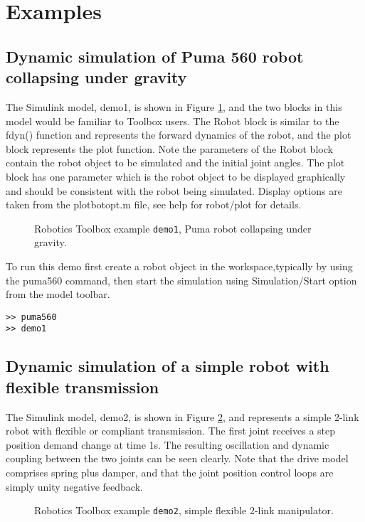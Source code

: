 \documentclass{article}
\newcommand{\var}[1]{{\vtt #1}}
\begin{document}
\section{Examples}
\subsection{Dynamic simulation of Puma 560 robot collapsing under gravity}
The Simulink model, \var{demo1}, is shown in Figure \ref{fig:demo1}, and 
the two blocks in this model would be
familiar to Toolbox users.
The \var{Robot} block is similar to the \var{fdyn()}
function and represents the forward dynamics of the robot, and the \var{plot}
block represents the \var{plot} function.
Note the parameters of the \var{Robot} block contain the robot object 
to be simulated and the initial joint angles.  
The \var{plot} block has one parameter which is the robot object to be 
displayed graphically and should be consistent with the robot being simulated.
Display options are taken from the \var{plotbotopt.m} file, see help
for \var{robot/plot} for details.
\begin{figure}
\caption{Robotics Toolbox example \texttt{demo1}, Puma robot
collapsing under gravity.}\label{fig:demo1}
\end{figure}

To run this demo first create a robot object in
the workspace,typically by using the \var{puma560} command, then start
the simulation using Simulation/Start option from the model toolbar.
\begin{verbatim}
>> puma560
>> demo1
\end{verbatim}

\subsection{Dynamic simulation of a simple robot with flexible
transmission}
The Simulink model, \var{demo2}, is shown in Figure \ref{fig:demo2}, and
represents a simple 2-link robot with flexible or compliant transmission.
The first joint receives a step position
demand change at time 1s.  The resulting oscillation and dynamic coupling
between the two joints can be seen clearly.  Note that the drive model
comprises spring plus damper, and that the joint position control loops
are simply unity negative feedback.

\begin{figure}
\caption{Robotics Toolbox example \texttt{demo2}, simple flexible
2-link manipulator.}\label{fig:demo2}
\end{figure}
\end{document}
